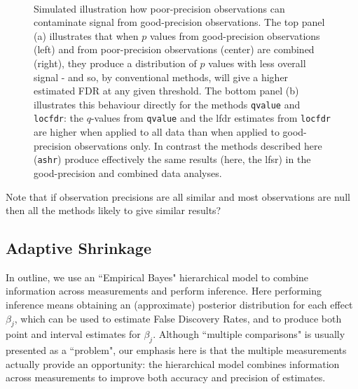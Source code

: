 \documentclass[11pt]{article}
\def\shat{\hat{s}}
\def\qvalue{{\tt qvalue}\xspace}
\def\locfdr{{\tt locfdr}\xspace}
\def\ashr{{\tt ashr}\xspace}
\begin{document}
\begin{figure}
\centering
{} \\
\caption{Simulated illustration how poor-precision observations can contaminate signal from good-precision observations. The top panel (a) illustrates that when 
$p$ values from good-precision observations (left) and from poor-precision observations (center) are combined (right), they produce
a distribution of $p$ values with less overall signal - and so, by conventional methods, will give a higher estimated FDR at any given threshold.
The bottom panel (b) illustrates this behaviour directly for the methods \qvalue and \locfdr: the $q$-values from \qvalue and the lfdr estimates from \locfdr are higher when applied to all data than when applied to good-precision observations only. In contrast the methods described here (\ashr) produce effectively the same results (here, the lfsr) in the good-precision and combined data analyses.} \label{fig:goodpoor}
\end{figure}


Note that if observation precisions are all similar and most observations are null then all the methods likely to give similar results?

 \subsection*{Adaptive Shrinkage}
 
 
 In outline, we use an ``Empirical Bayes" hierarchical model to combine information across measurements and perform inference.
 Here performing inference means obtaining an (approximate) posterior distribution for each effect $\beta_j$,
which can be used to estimate False Discovery Rates, and to produce both point and interval estimates for $\beta_j$.
 Although ``multiple comparisons" is usually presented as a ``problem", our emphasis here is that the multiple measurements
 actually provide an opportunity: the hierarchical model combines information across measurements to improve both accuracy and precision of estimates. 
 
\end{document}
